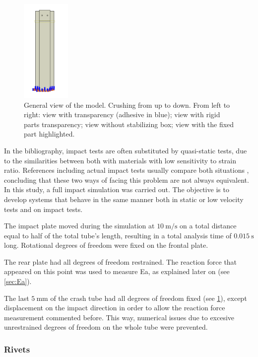 \documentclass[
documentsize = a4, %
font = cmr, %
typesize = 11, %
printmode = true,
onehalfspacing = true,
language = en, %
titlepage = udciccp, %
degree = pt, %
dedication = true,
acknowledgements = true,
abstract-en = true,
abstract-es = false,
abstract-ga = false,
epigraphs = true,
toc = true,
lof = true,
lot = true,
frontmatterintoc = false,
notation = false,
minimal = false,
]{UDCthesis}
\begin{document}
\begin{figure}
\begin{minipage}[b]{.22\linewidth}
	\end{minipage}
	\quad
	\begin{minipage}[b]{.22\linewidth}
		\centering
		\includegraphics[height=5cm]{IMG_CUTRES/general_encastre}
	\end{minipage}
	\caption[General view of the model.]{General view of the model. Crushing from up to down. From left to right: view with transparency (adhesive in blue); view with rigid parts transparency; view without stabilizing box; view with the fixed part highlighted.}
	\label{fig:general}
\end{figure}

In the bibliography, impact tests are often substituted by quasi-static tests, due to the similarities between both with materials with low sensitivity to strain ratio. References including actual impact tests usually compare both situations \citep{Goglio2008, Peroni2009}, concluding that these two ways of facing this problem are not always equivalent. In this study, a full impact simulation was carried out. The objective is to develop systems that behave in the same manner both in static or low velocity tests and on impact  tests.

The impact plate moved during the simulation at $\SI{10}{\m/\s}$ on a total distance equal to half of the total tube's length, resulting in a total analysis time of $\SI{0.015}{\s}$ long. Rotational degrees of freedom were fixed on the frontal plate.

The rear plate had all degrees of freedom restrained. The reaction force that appeared on this point was used to measure \gls{Ea}, as explained later on (see \cref{sec:Ea}).

The last $\SI{5}{\mm}$ of the crash tube had all degrees of freedom fixed (see \cref{fig:general}), except displacement on the impact direction in order to allow the reaction force measurement commented before. This way, numerical issues due to excesive unrestrained degrees of freedom on the whole tube were prevented.

\subsubsection{Rivets}
\end{document}

